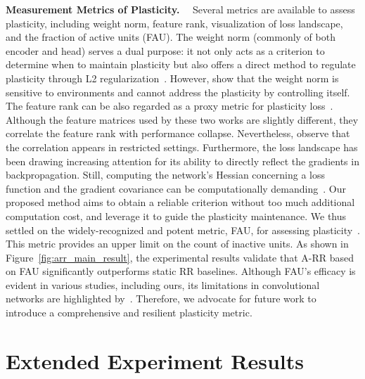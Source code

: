 \textbf{Measurement Metrics of Plasticity.}~~
\label{Appendix: Measurement Metrics of Plasticity}
Several metrics are available to assess plasticity, including weight norm, feature rank, visualization of loss landscape, and the fraction of active units (FAU). The weight norm (commonly of both encoder and head) serves a dual purpose: it not only acts as a criterion to determine when to maintain plasticity but also offers a direct method to regulate plasticity through L2 regularization~\citep{dormant_neuron, Plasticity_Injection}. However, \citet{Plasticity_Injection} show that the weight norm is sensitive to environments and cannot address the plasticity by controlling itself. The feature rank can be also regarded as a proxy metric for plasticity loss~\citep{implicit_under-parameterization, capacity_loss}. Although the feature matrices used by these two works are slightly different, they correlate the feature rank with performance collapse. Nevertheless, \citet{gulcehre2022empirical} observe that the correlation appears in restricted settings. Furthermore, the loss landscape has been drawing increasing attention for its ability to directly reflect the gradients in backpropagation. Still, computing the network's Hessian concerning a loss function and the gradient covariance can be computationally demanding~\citep{understanding_plasticity}. Our proposed method aims to obtain a reliable criterion without too much additional computation cost, and leverage it to guide the plasticity maintenance. We thus settled on the widely-recognized and potent metric, FAU, for assessing plasticity~\citep{dormant_neuron, plasticity_loss_CRL}. This metric provides an upper limit on the count of inactive units. As shown in Figure~\ref{fig:arr_main_result}, the experimental results validate that A-RR based on FAU significantly outperforms static RR baselines. Although FAU's efficacy is evident in various studies, including ours, its limitations in convolutional networks are highlighted by~\citep{understanding_plasticity}. Therefore, we advocate for future work to introduce a comprehensive and resilient plasticity metric.

\newpage
\section{Extended Experiment Results}
